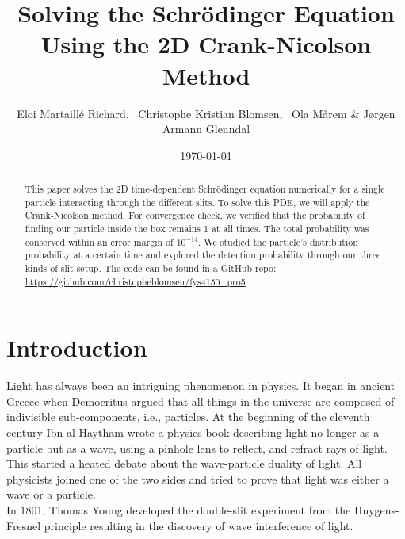 \documentclass[english,notitlepage,reprint,nofootinbib]{revtex4-2}  %
\begin{document}
	
	\title{Solving the Schrödinger Equation Using the 2D Crank-Nicolson Method}  %
	\author{Eloi Martaillé Richard,
	\
	Christophe Kristian Blomsen,
	\
	Ola Mårem
	\&
	Jørgen Armann Glenndal
    }
	\date{\today}                             %
	\noaffiliation                            %
	
	\begin{abstract}
This paper solves the 2D time-dependent Schrödinger equation numerically for a single particle
	interacting through the different slits. To solve this PDE, we will apply the
	Crank-Nicolson method. For convergence check, we verified that the probability of finding our particle inside the box remains 1 at all times. The total probability was conserved within an
	error margin of  $10^{-14}$. We studied the particle's distribution probability at a certain time and explored the detection probability through our three kinds of slit setup.
	The code can be found in a GitHub repo:		\href{https://github.com/christopheblomsen/fys4150_pro5}{https://github.com/christopheblomsen/fys4150\_pro5}

\end{abstract}
	\maketitle	
	
	
	\section{Introduction} \label{sec:introduction}

	Light has always been an intriguing phenomenon in physics. It began in ancient Greece when Democritus argued that all things in the universe are composed of indivisible
	sub-components, i.e., particles. At the beginning of the eleventh century Ibn al-Haytham
	wrote a physics book describing light no longer as a particle but as a wave, using a
	pinhole lens to reflect, and refract rays of light. This started a heated debate about the
	wave-particle duality of light. All physicists joined one of the two sides and tried to
	prove that light was either a wave or a particle. \\

	In 1801, Thomas Young developed the double-slit experiment from the Huygens-Fresnel principle
	resulting in the discovery of wave interference of light\cite{ThomasYoung}.
\end{document}
